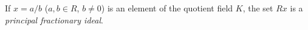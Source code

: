 If $x = a/b$ ($a, b \in R$, $b \neq 0$) is an element of the quotient field $K$, the set $Rx$ is a \textit{principal fractionary ideal}.
